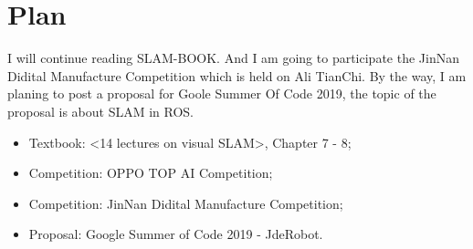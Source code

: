 \documentclass{article}
\begin{document}
    \section{Plan}
    I will continue reading SLAM-BOOK. And I am going to participate the JinNan Didital Manufacture Competition which is held on Ali TianChi. By the way, I am planing to post a proposal for Goole Summer Of Code 2019, the topic of the proposal is about SLAM in ROS.
    \begin{itemize}
        \item Textbook: <14 lectures on visual SLAM>, Chapter 7 - 8;
        \item Competition: OPPO TOP AI Competition;
        \item Competition: JinNan Didital Manufacture Competition;
        \item Proposal: Google Summer of Code 2019 - JdeRobot.
    \end{itemize}
    
\end{document}
